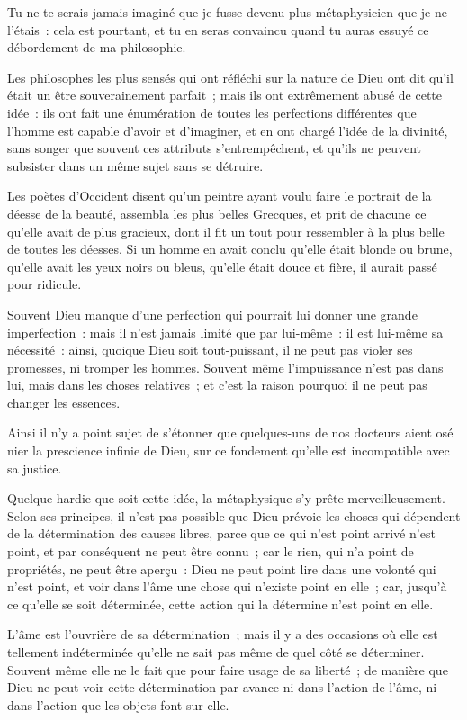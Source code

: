 \documentclass[french,twoside]{book} %
\begin{document}
\noindent Tu ne te serais jamais imaginé que je fusse devenu plus métaphysicien que je ne l’étais : cela est pourtant, et tu en seras convaincu quand tu auras essuyé ce débordement de ma philosophie.\par
Les philosophes les plus sensés qui ont réfléchi sur la nature de Dieu ont dit qu’il était un être souverainement parfait ; mais ils ont extrêmement abusé de cette idée : ils ont fait une énumération de toutes les perfections différentes que l’homme est capable d’avoir et d’imaginer, et en ont chargé l’idée de la divinité, sans songer que souvent ces attributs s’entrempêchent, et qu’ils ne peuvent subsister dans un même sujet sans se détruire.\par
Les poètes d’Occident disent qu’un peintre ayant voulu faire le portrait de la déesse de la beauté, assembla les plus belles Grecques, et prit de chacune ce qu’elle avait de plus gracieux, dont il fit un tout pour ressembler à la plus belle de toutes les déesses. Si un homme en avait conclu qu’elle était blonde ou brune, qu’elle avait les yeux noirs ou bleus, qu’elle était douce et fière, il aurait passé pour ridicule.\par
Souvent Dieu manque d’une perfection qui pourrait lui donner une grande imperfection : mais il n’est jamais limité que par lui-même : il est lui-même sa nécessité : ainsi, quoique Dieu soit tout-puissant, il ne peut pas violer ses promesses, ni tromper les hommes. Souvent même l’impuissance n’est pas dans lui, mais dans les choses relatives ; et c’est la raison pourquoi il ne peut pas changer les essences.\par
Ainsi il n’y a point sujet de s’étonner que quelques-uns de nos docteurs aient osé nier la prescience infinie de Dieu, sur ce fondement qu’elle est incompatible avec sa justice.\par
Quelque hardie que soit cette idée, la métaphysique s’y prête merveilleusement. Selon ses principes, il n’est pas possible que Dieu prévoie les choses qui dépendent de la détermination des causes libres, parce que ce qui n’est point arrivé n’est point, et par conséquent ne peut être connu ; car le rien, qui n’a point de propriétés, ne peut être aperçu : Dieu ne peut point lire dans une volonté qui n’est point, et voir dans l’âme une chose qui n’existe point en elle ; car, jusqu’à ce qu’elle se soit déterminée, cette action qui la détermine n’est point en elle.\par
L’âme est l’ouvrière de sa détermination ; mais il y a des occasions où elle est tellement indéterminée qu’elle ne sait pas même de quel côté se déterminer. Souvent même elle ne le fait que pour faire usage de sa liberté ; de manière que Dieu ne peut voir cette détermination par avance ni dans l’action de l’âme, ni dans l’action que les objets font sur elle.\par
\end{document}
